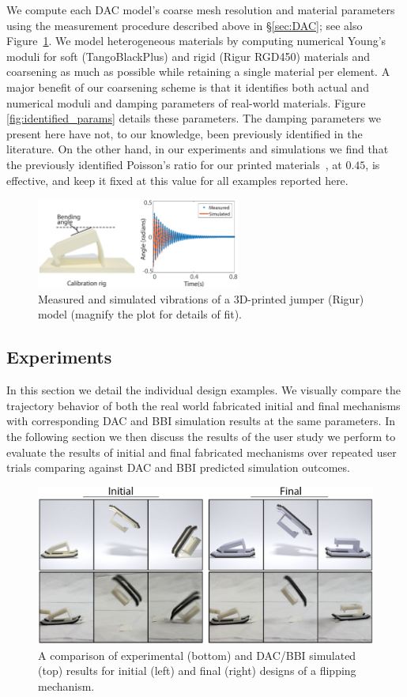 We compute each DAC model's coarse mesh resolution and material parameters using the measurement procedure described above in \S\ref{sec:DAC}; see also Figure~\ref{fig:vibration_match}. We model heterogeneous materials by computing numerical Young's moduli for soft (TangoBlackPlus) and rigid (Rigur RGD450) materials and coarsening as much as possible while retaining a single material per element. A major benefit of our coarsening scheme is that it identifies both actual and numerical moduli and damping parameters of real-world materials. Figure \ref{fig:identified_params} details these parameters. The damping parameters we present here have not, to our knowledge, been previously identified in the literature. On the other hand, in our experiments and simulations we find that the previously identified Poisson's ratio for our printed materials~\cite{major2011}, at $0.45$, is effective, and keep it fixed at this value for all examples reported here.
\begin{figure}
	\centering
\includegraphics[width=0.6\textwidth]{figs/measure.pdf}
\caption{Measured and simulated vibrations of a 3D-printed jumper (Rigur) model (magnify the plot for details of fit).}
\label{fig:vibration_match}
\end{figure}

\subsection{Experiments}
\label{sec:exp}

In this section we detail the individual design examples. We visually compare the trajectory behavior of both the real world fabricated initial and final mechanisms with corresponding DAC and BBI simulation results at the same parameters.
In the following section we then discuss the results of the user study we perform to evaluate the results of initial and final fabricated mechanisms over repeated user trials comparing against DAC and BBI predicted simulation outcomes.

\begin{figure}[h!]
	\centering
\includegraphics[width=0.7\columnwidth]{images/ResultsFlipper.png}
\caption{A comparison of experimental (bottom) and DAC/BBI simulated (top) results for initial (left) and final (right) designs of a flipping mechanism.}
\label{fig:flipper}	
\end{figure}

